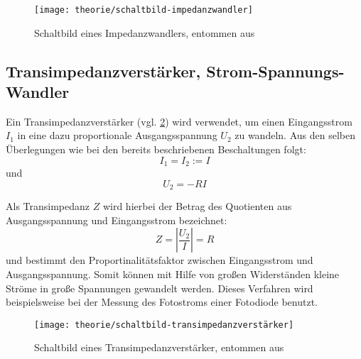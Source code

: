 \begin{figure}[H]
	\centering
	\texttt{[image: theorie/schaltbild-impedanzwandler]}
	\caption{Schaltbild eines Impedanzwandlers, entommen
	aus \cite{script}}
	\label{fig:Theorie/Impedanzwandler}
\end{figure}

\subsection{Transimpedanzverstärker, Strom-Spannungs-Wandler}
Ein Transimpedanzverstärker (vgl. \cref{fig:Theorie/Transimpedanzverstärker})
wird verwendet, um einen Eingangsstrom $I_1$ in eine dazu proportionale 
Ausgangsspannung $U_2$ zu wandeln. Aus den selben Überlegungen wie bei den
bereits beschriebenen Beschaltungen folgt:
\begin{equation}
	I_1 = I_2 := I
\end{equation}
und
\begin{equation}
	U_2 = - R I
\end{equation}

Als Transimpedanz $Z$ wird hierbei  der Betrag des Quotienten aus 
Ausgangsspannung und Eingangsstrom bezeichnet:
\begin{equation}
	Z = \left| \dfrac{U_2}{I} \right| = R
\end{equation}
und bestimmt den Proportinalitätsfaktor zwischen Eingangsstrom und 
Ausgangsspannung. Somit können mit Hilfe von großen Widerständen kleine 
Ströme in große Spannungen gewandelt werden. Dieses Verfahren wird 
beispielsweise bei der Messung des Fotostroms einer Fotodiode benutzt.

\begin{figure}[H]
	\centering
	\texttt{[image: theorie/schaltbild-transimpedanzverstärker]}
	\caption{Schaltbild eines Transimpedanzverstärker, entommen
	aus \cite{script}}
	\label{fig:Theorie/Transimpedanzverstärker}
\end{figure}